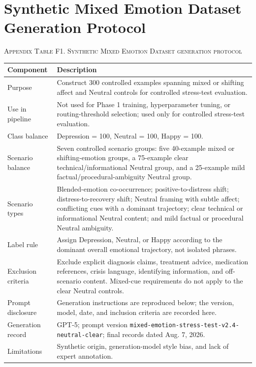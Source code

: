 \documentclass{ieeeaccess}
\begin{document}
\section{Synthetic Mixed Emotion Dataset Generation Protocol}

\par\medskip
\noindent\textsc{Appendix Table F1. Synthetic Mixed Emotion Dataset generation protocol}\par
\label{tab:appendix-a5-mixed-emotion-protocol}
\smallskip
\small
\setlength{\tabcolsep}{4pt}
\renewcommand{\arraystretch}{1.08}
\noindent\begin{tabularx}{\textwidth}{@{}>{\raggedright\arraybackslash}p{}Y@{}}
\toprule
Component & Description \\
\midrule
Purpose & Construct 300 controlled examples spanning mixed or shifting affect and Neutral controls for controlled stress-test evaluation. \\
Use in pipeline & Not used for Phase 1 training, hyperparameter tuning, or routing-threshold selection; used only for controlled stress-test evaluation. \\
Class balance & Depression = 100, Neutral = 100, Happy = 100. \\
Scenario balance & Seven controlled scenario groups: five 40-example mixed or shifting-emotion groups, a 75-example clear technical/informational Neutral group, and a 25-example mild factual/procedural-ambiguity Neutral group. \\
Scenario types & Blended-emotion co-occurrence; positive-to-distress shift; distress-to-recovery shift; Neutral framing with subtle affect; conflicting cues with a dominant trajectory; clear technical or informational Neutral content; and mild factual or procedural Neutral ambiguity. \\
Label rule & Assign Depression, Neutral, or Happy according to the dominant overall emotional trajectory, not isolated phrases. \\
Exclusion criteria & Exclude explicit diagnosis claims, treatment advice, medication references, crisis language, identifying information, and off-scenario content. Mixed-cue requirements do not apply to the clear Neutral controls. \\
Prompt disclosure & Generation instructions are reproduced below; the version, model, date, and inclusion criteria are recorded here. \\
Generation record & GPT-5; prompt version \texttt{mixed-emotion-stress-test-v2.4-neutral-clear}; final records dated Aug. 7, 2026. \\
Limitations & Synthetic origin, generation-model style bias, and lack of expert annotation. \\
\bottomrule
\end{tabularx}
\par\medskip
\end{document}
